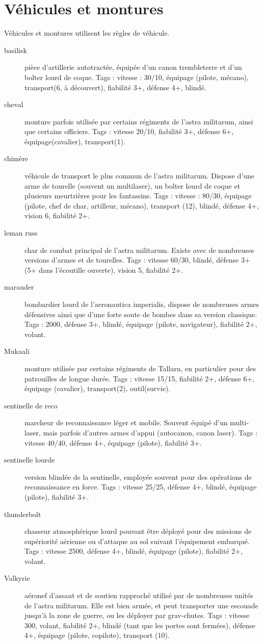 \documentclass[10pt,a4paper]{article}
\begin{document}
\section{Véhicules et montures}
Véhicules et montures utilisent les règles de véhicule.
\begin{description}
\item[basilisk ]pièce d'artillerie autotractée, équipée d'un canon trembleterre et d'un bolter lourd de coque. Tags : vitesse : 30/10, équipage (pilote, mécano), transport(6, à découvert), fiabilité 3+, défense 4+, blindé.
\item[cheval ]monture parfois utilisée par certains régiments de l'astra militarum, ainsi que certains officiers. Tags : vitesse 20/10, fiabilité 3+, défense 6+, équipage(cavalier), transport(1).
\item[chimère ]véhicule de transport le plus commun de l'astra militarum. Dispose d'une arme de tourelle (souvent un multilaser), un bolter lourd de coque et plusieurs meurtrières pour les fantassins. Tags : vitesse : 80/30, équipage (pilote, chef de char, artilleur, mécano), transport (12), blindé, défense 4+, vision 6, fiabilité 2+.
\item[leman russ ]char de combat principal de l'astra militarum. Existe avec de nombreuses versions d'armes et de tourelles. Tags : vitesse 60/30, blindé, défense 3+ (5+ dans l'écoutille ouverte), vision 5, fiabilité 2+.
\item[marauder]bombardier lourd de l'aeronautica imperialis, dispose de nombreuses armes défensives ainsi que d'une forte soute de bombes dans sa version classique. Tags : 2000, défense 3+, blindé, équipage (pilote, navigateur), fiabilité 2+, volant.
\item[Mukaali ] monture utilisée par certains régiments de Tallarn, en particulier pour des patrouilles de longue durée. Tags : vitesse 15/15, fiabilité 2+, défense 6+, équipage (cavalier), transport(2), outil(survie).
\item[sentinelle de reco ]marcheur de reconnaissance léger et mobile. Souvent équipé d'un multi-laser, mais parfois d'autres armes d'appui (autocanon, canon laser). Tags : vitesse 40/40, défense 4+, équipage (pilote), fiabilité 3+.
\item[sentinelle lourde]version blindée de la sentinelle, employée souvent pour des opérations de reconnaissance en force. Tags : vitesse 25/25, défense 4+, blindé, équipage (pilote), fiabilité 3+.
\item[thunderbolt]chasseur atmosphérique lourd pouvant être déployé pour des missions de supériorité aérienne ou d'attaque au sol suivant l'équipement embarqué. Tags : vitesse 2500, défense 4+, blindé, équipage (pilote), fiabilité 2+, volant.
\item[Valkyrie]aéronef d'assaut et de soutien rapproché utilisé par de nombreuses unités de l'astra militarum. Elle est bien armée, et peut transporter une escouade jusqu'à la zone de guerre, ou les déployer par grav-chutes. Tags : vitesse 300, volant, fiabilité 2+, blindé (tant que les portes sont fermées), défense 4+, équipage (pilote, copilote), transport (10).


\end{description}
\end{document}
